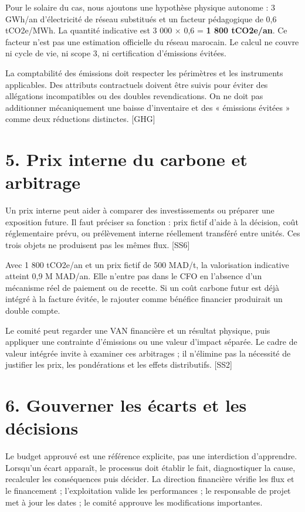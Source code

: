 \documentclass[12pt,a4paper]{article}
\begin{document}
Pour le solaire du cas, nous ajoutons une hypothèse physique autonome : 3 GWh/an d’électricité de réseau substitués et un facteur pédagogique de 0,6 tCO2e/MWh. La quantité indicative est 3 000 $\times$ 0,6 = \textbf{1 800 tCO2e/an}. Ce facteur n’est pas une estimation officielle du réseau marocain. Le calcul ne couvre ni cycle de vie, ni scope 3, ni certification d’émissions évitées.


La comptabilité des émissions doit respecter les périmètres et les instruments applicables. Des attributs contractuels doivent être suivis pour éviter des allégations incompatibles ou des doubles revendications. On ne doit pas additionner mécaniquement une baisse d’inventaire et des « émissions évitées » comme deux réductions distinctes. [GHG]

\section*{5. Prix interne du carbone et arbitrage}
Un prix interne peut aider à comparer des investissements ou préparer une exposition future. Il faut préciser sa fonction : prix fictif d’aide à la décision, coût réglementaire prévu, ou prélèvement interne réellement transféré entre unités. Ces trois objets ne produisent pas les mêmes flux. [SS6]


Avec 1 800 tCO2e/an et un prix fictif de 500 MAD/t, la valorisation indicative atteint 0,9 M MAD/an. Elle n’entre pas dans le CFO en l’absence d’un mécanisme réel de paiement ou de recette. Si un coût carbone futur est déjà intégré à la facture évitée, le rajouter comme bénéfice financier produirait un double compte.


Le comité peut regarder une VAN financière et un résultat physique, puis appliquer une contrainte d’émissions ou une valeur d’impact séparée. Le cadre de valeur intégrée invite à examiner ces arbitrages ; il n’élimine pas la nécessité de justifier les prix, les pondérations et les effets distributifs. [SS2]

\section*{6. Gouverner les écarts et les décisions}
Le budget approuvé est une référence explicite, pas une interdiction d’apprendre. Lorsqu’un écart apparaît, le processus doit établir le fait, diagnostiquer la cause, recalculer les conséquences puis décider. La direction financière vérifie les flux et le financement ; l’exploitation valide les performances ; le responsable de projet met à jour les dates ; le comité approuve les modifications importantes.
\end{document}
